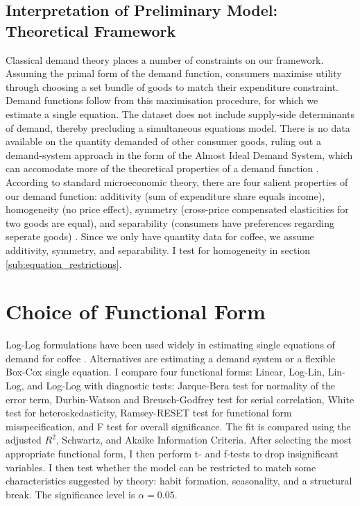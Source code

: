 \documentclass[12pt]{article}
\begin{document}
\subsection{Interpretation of Preliminary Model: Theoretical Framework} %
\label{sec:review_of_theory_demand_for_coffee}
Classical demand theory places a number of constraints on our framework. Assuming the primal form of the demand function, consumers maximise utility through choosing a set bundle of goods to match their expenditure constraint. Demand functions follow from this maximisation procedure, for which we estimate a single equation. The dataset does not include supply-side determinants of demand, thereby precluding a simultaneous equations model. There is no data available on the quantity demanded of other consumer goods, ruling out a demand-system approach in the form of the Almost Ideal Demand System, which can accomodate more of the theoretical properties of a demand function \parencite{deatonAlmostIdealDemand1980}. According to standard microeconomic theory, there are four salient properties of our demand function: additivity (sum of expenditure share equals income), homogeneity (no price effect), symmetry (cross-price compensated elasticities for two goods are equal), and separability (consumers have preferences regarding seperate goods) \parencite{snyderMicroeconomicTheoryBasic2012}. Since we only have quantity data for coffee, we assume additivity, symmetry, and separability. I test for homogeneity in section \ref{sub:equation_restrictions}.




\section{Choice of Functional Form} %
\label{sec:choice_of_functional_form}
Log-Log formulations have been used widely in estimating single equations of demand for coffee \parencite{okunadeFunctionalFormsHabit1992}. Alternatives are estimating a demand system or a flexible Box-Cox single equation. I compare four functional forms: Linear, Log-Lin, Lin-Log, and Log-Log with diagnostic tests: Jarque-Bera test for normality of the error term, Durbin-Watson and Breusch-Godfrey test for serial correlation, White test for heteroskedasticity, Ramsey-RESET test for functional form misspecification, and F test for overall significance. The fit is compared using the adjusted \(R^2\), Schwartz, and Akaike Information Criteria. After selecting the most appropriate functional form, I then perform t- and f-tests to drop insignificant variables. I then test whether the model can be restricted to match some characteristics suggested by theory: habit formation, seasonality, and a structural break. The significance level is \(\alpha = 0.05\).
\end{document}
